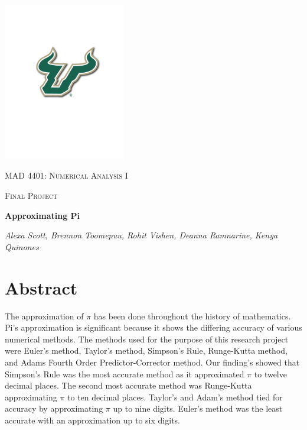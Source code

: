 \documentclass[letterpaper,12pt]{article}
\begin{document}
\begin{titlepage}
	\centering
	\includegraphics[width=0.40\textwidth]{usf.png}\par\vspace{0.1cm}
	{\scshape\LARGE MAD 4401: Numerical Analysis I \par}
	\vspace{1cm}
	{\scshape\Large Final Project\par}
	\vspace{1cm}
	{\huge\bfseries Approximating Pi\par}
	\vspace{1cm}
	{\Large\itshape Alexa Scott, Brennon Toomepuu, Rohit Vishen, Deanna Ramnarine, Kenya Quinones \par}
	\vfill
	

	\vfill

	{\date{\textbf{Due Date:} December 3, 2019}\par}
\end{titlepage}




\pagebreak
\section{Abstract}

\indent The approximation of $\pi$ has been done throughout the history of mathematics. Pi's approximation is significant because it shows the differing accuracy of various numerical methods. The methods used for the purpose of this research project were Euler's method, Taylor's method, Simpson's Rule, Runge-Kutta method, and Adams Fourth Order Predictor-Corrector method. Our finding's showed that Simpson's Rule was the most accurate method as it approximated $\pi$ to twelve decimal places. The second most accurate method was Runge-Kutta approximating $\pi$ to ten decimal places. Taylor's and Adam's method tied for accuracy by approximating $\pi$ up to nine digits. Euler's method was the least accurate with an approximation up to six digits.    
\end{document}
